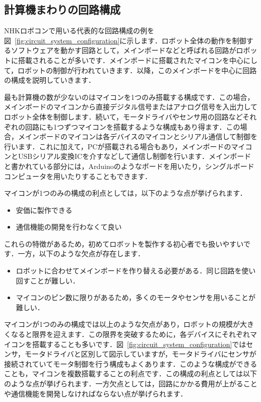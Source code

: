 \subsection{計算機まわりの回路構成}

NHKロボコンで用いる代表的な回路構成の例を図~\ref{fig:circuit_system_configuration}に示します．ロボット全体の動作を制御するソフトウェアを動かす回路として，メインボードなどと呼ばれる回路がロボットに搭載されることが多いです．メインボードに搭載されたマイコンを中心にして，ロボットの制御が行われていきます．以降，このメインボードを中心に回路の構成を説明していきます．

最も計算機の数が少ないのはマイコンを1つのみ搭載する構成です．この場合，メインボードのマイコンから直接デジタル信号またはアナログ信号を入出力してロボット全体を制御します．続いて，モータドライバやセンサ用の回路などそれぞれの回路にも1つずつマイコンを搭載するような構成もあり得ます．この場合，メインボードのマイコンは各デバイスのマイコンとシリアル通信して制御を行います．これに加えて，PCが搭載される場合もあり，メインボードのマイコンとUSBシリアル変換ICを介すなどして通信し制御を行います．メインボードと書かれている部分には，Arduinoのようなボードを用いたり，シングルボードコンピュータを用いたりすることもできます．

マイコンが1つのみの構成の利点としては，以下のような点が挙げられます．

\begin{itemize}
    \item 安価に製作できる
    \item 通信機能の開発を行わなくて良い
\end{itemize}

これらの特徴があるため，初めてロボットを製作する初心者でも扱いやすいです．一方，以下のような欠点が存在します．

\begin{itemize}
    \item ロボットに合わせてメインボードを作り替える必要がある．同じ回路を使い回すことが難しい．
    \item マイコンのピン数に限りがあるため，多くのモータやセンサを用いることが難しい．
\end{itemize}

マイコンが1つのみの構成では以上のような欠点があり，ロボットの規模が大きくなると限界を迎えます．この限界を突破するために，各デバイスにそれぞれマイコンを搭載することも多いです．図~\ref{fig:circuit_system_configuration}ではセンサ，モータドライバと区別して図示していますが，モータドライバにセンサが接続されていてモータ制御を行う構成もよくあります．このような構成ができることも，マイコンを複数搭載することの利点です．この構成の利点としては以下のような点が挙げられます．一方欠点としては，回路にかかる費用が上がることや通信機能を開発しなければならない点が挙げられます．

